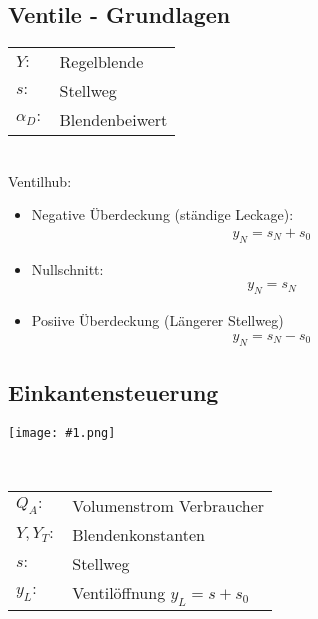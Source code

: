 \documentclass[landscape,a4paper,10pt]{article}
\newcommand{\graphiccol}[1]{
\noindent
\begin{minipage}{\columnwidth}
\centering
\texttt{[image: \#1.png]}
\end{minipage}
\medskip \\
}
\begin{document}
\begin{multicols*}{3}
\subsection{Ventile - Grundlagen}
\begin{tabular}{ll}
$Y:$ & Regelblende \\
$s:$ & Stellweg \\
$\alpha_D:$ & Blendenbeiwert
\end{tabular} \\


Ventilhub: 
\begin{itemize}
\item Negative Überdeckung (ständige Leckage):
\begin{align*}
y_N = s_N + s_0 
\end{align*}
\item Nullschnitt:
\begin{align*}
y_N = s_N
\end{align*}
\item Posiive Überdeckung (Längerer Stellweg)
\begin{align*}
y_N = s_N - s_0
\end{align*}
\end{itemize}


\subsection{Einkantensteuerung}
\graphiccol{einkantensteuerung}


\begin{tabular}{ll}
$Q_A:$ & Volumenstrom Verbraucher \\
$Y, Y_T:$ & Blendenkonstanten \\
$s:$ & Stellweg \\
$y_L:$  & Ventilöffnung $y_L = s + s_0$
\end{tabular} \\






\end{multicols*}
\end{document}
